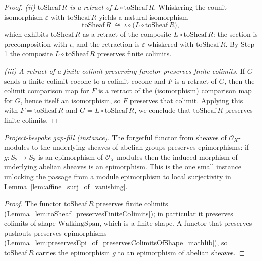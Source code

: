 \begin{proof}
  \emph{(ii) \(\mathrm{toSheaf}\,R\) is a retract of \(L \circ \mathrm{toSheaf}\,R\).} Whiskering the
  counit isomorphism \(\varepsilon\) with \(\mathrm{toSheaf}\,R\) yields a natural isomorphism
  \[
    \mathrm{toSheaf}\,R \;\cong\; \iota \circ \bigl(L \circ \mathrm{toSheaf}\,R\bigr),
  \]
  which exhibits \(\mathrm{toSheaf}\,R\) as a retract of the composite \(L \circ \mathrm{toSheaf}\,R\):
  the section is precomposition with \(\iota\), and the retraction is \(\varepsilon\) whiskered with
  \(\mathrm{toSheaf}\,R\). By Step 1 the composite \(L \circ \mathrm{toSheaf}\,R\) preserves finite
  colimits.

  \emph{(iii) A retract of a finite-colimit-preserving functor preserves finite colimits.} If \(G\)
  sends a finite colimit cocone to a colimit cocone and \(F\) is a retract of \(G\), then the colimit
  comparison map for \(F\) is a retract of the (isomorphism) comparison map for \(G\), hence itself an
  isomorphism, so \(F\) preserves that colimit. Applying this with \(F = \mathrm{toSheaf}\,R\) and
  \(G = L \circ \mathrm{toSheaf}\,R\), we conclude that \(\mathrm{toSheaf}\,R\) preserves finite
  colimits.
\end{proof}

\begin{lemma}
  \label{lem:to_sheaf_preserves_epi}
  \leanok
  \textit{Project-bespoke gap-fill (instance).}
  The forgetful functor from sheaves of \(\mathcal{O}_X\)-modules to the underlying sheaves of
  abelian groups preserves epimorphisms: if \(g : S_2 \to S_3\) is an epimorphism of
  \(\mathcal{O}_X\)-modules then the induced morphism of underlying abelian sheaves is an
  epimorphism. This is the one small instance unlocking the passage from a module epimorphism to
  local surjectivity in Lemma~\ref{lem:affine_surj_of_vanishing}.
\end{lemma}
\begin{proof}
  \leanok
  The functor \(\mathrm{toSheaf}\,R\) preserves finite colimits
  (Lemma~\ref{lem:toSheaf_preservesFiniteColimits}); in particular it preserves colimits of shape
  \(\mathrm{WalkingSpan}\), which is a finite shape. A functor that preserves pushouts preserves
  epimorphisms (Lemma~\ref{lem:preservesEpi_of_preservesColimitsOfShape_mathlib}), so
  \(\mathrm{toSheaf}\,R\) carries the epimorphism \(g\) to an epimorphism of abelian sheaves.
\end{proof}

